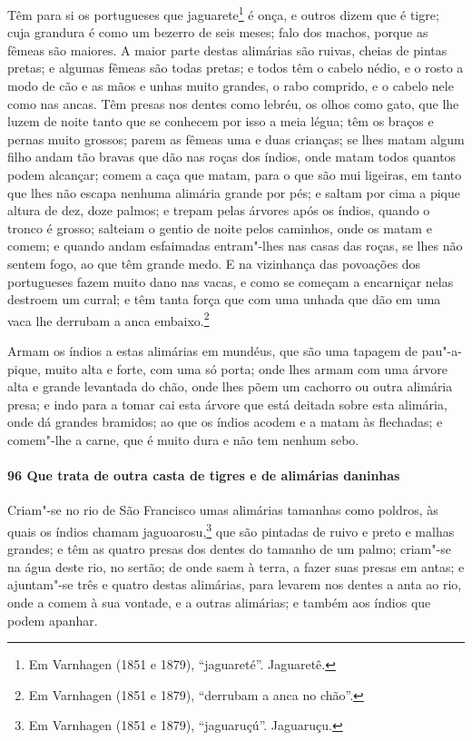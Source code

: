 Têm para si os portugueses que jaguarete\footnote{ Em Varnhagen (1851 e 1879),
``jaguareté''. Jaguaretê.} é onça, e outros dizem que é tigre; cuja grandura é como um
bezerro de seis meses; falo dos machos, porque as fêmeas são maiores. A maior parte destas
alimárias são ruivas, cheias de pintas pretas; e algumas fêmeas são todas pretas; e todos
têm o cabelo nédio, e o rosto a modo de cão e as mãos e unhas muito grandes, o rabo
comprido, e o cabelo nele como nas ancas. Têm presas nos dentes como lebréu, os olhos como
gato, que lhe luzem de noite tanto que se conhecem por isso a meia légua; têm os braços e
pernas muito grossos; parem as fêmeas uma e duas crianças; se lhes matam algum filho andam
tão bravas que dão nas roças dos índios, onde matam todos quantos podem alcançar; comem a
caça que matam, para o que são mui ligeiras, em tanto que lhes não escapa nenhuma alimária
grande por pés; e saltam por cima a pique altura de dez, doze palmos; e trepam pelas
árvores após os índios, quando o tronco é grosso; salteiam o gentio de noite pelos
caminhos, onde os matam e comem; e quando andam esfaimadas entram"-lhes nas casas das
roças, se lhes não sentem fogo, ao que têm grande medo. E na vizinhança das povoações dos
portugueses fazem muito dano nas vacas, e como se começam a encarniçar nelas destroem um
curral; e têm tanta força que com uma unhada que dão em uma vaca lhe derrubam a anca
embaixo.\footnote{ Em Varnhagen (1851 e 1879), ``derrubam a anca no chão''.}

Armam os índios a estas alimárias em mundéus, que são uma tapagem de pau"-a-pique, muito
alta e forte, com uma só porta; onde lhes armam com uma árvore alta e grande levantada do
chão, onde lhes põem um cachorro ou outra alimária presa; e indo para a tomar cai esta
árvore que está deitada sobre esta alimária, onde dá grandes bramidos; ao que os índios
acodem e a matam às flechadas; e comem"-lhe a carne, que é muito dura e não tem nenhum
sebo.

\paragraph{96 Que trata de outra casta de tigres e de alimárias daninhas}

Criam"-se no rio de São Francisco umas alimárias tamanhas como poldros, às quais os índios
chamam jaguoarosu,\footnote{ Em Varnhagen (1851 e 1879), ``jaguaruçú''. Jaguaruçu.} que
são pintadas de ruivo e preto e malhas grandes; e têm as quatro presas dos dentes do
tamanho de um palmo; criam"-se na água deste rio, no sertão; de onde saem à terra, a fazer
suas presas em antas; e ajuntam"-se três e quatro destas alimárias, para levarem nos dentes
a anta ao rio, onde a comem à sua vontade, e a outras alimárias; e também aos índios que
podem apanhar.

